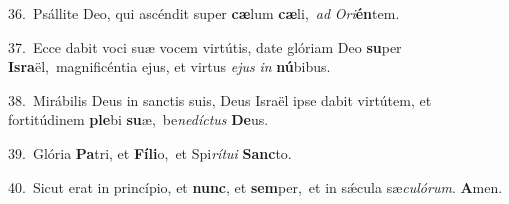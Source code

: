 {\numbfont\textcolor{\numbcolor}{36.}}~Psállite Deo, qui ascéndit super \textbf{cæ}\-lum \textbf{cæ}\-li,~\star \textit{ad} \textit{O}\-\textit{ri}\textbf{én}tem.\par
{\numbfont\textcolor{\numbcolor}{37.}}~Ecce dabit voci suæ vocem virtútis, date glóriam Deo \textbf{su}\-per \textbf{Is}\-\textbf{ra}ël,~\star magnificéntia ejus, et virtus \textit{e}\-\textit{jus} \textit{in} \textbf{nú}\-bibus.\par
{\numbfont\textcolor{\numbcolor}{38.}}~Mirábilis Deus in sanctis suis, Deus Israël ipse dabit virtútem, et fortitúdinem \textbf{ple}\-bi \textbf{su}\-æ,~\star be\-\textit{ne}\-\textit{díc}\textit{tus} \textbf{De}\-us.\par
{\numbfont\textcolor{\numbcolor}{39.}}~Glória \textbf{Pa}\-tri, et \textbf{Fí}\-\textbf{li}o,~\star et Spi\-\textit{rí}\-\textit{tu}\textit{i} \textbf{Sanc}\-to.\par
{\numbfont\textcolor{\numbcolor}{40.}}~Sicut erat in princípio, et \textbf{nunc}\-, et \textbf{sem}\-per,~\star et in sǽcula sæ\-\textit{cu}\-\textit{ló}\textit{rum}. \textbf{A}\-men.\par
